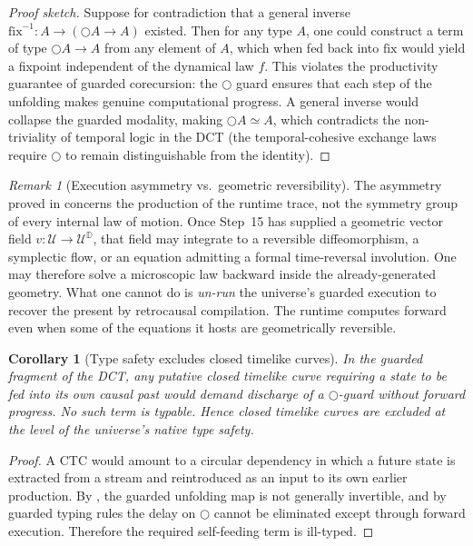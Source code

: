 \documentclass[11pt,a4paper]{article}
\theoremstyle{plain}
\newtheorem{corollary}[theorem]{Corollary}
\theoremstyle{definition}
\theoremstyle{remark}
\newtheorem{remark}[theorem]{Remark}
\newcommand{\D}{\mathbb{D}}
\newcommand{\U}{\mathcal{U}}
\newcommand{\nextmod}{\bigcirc}
\newcommand{\fix}{\mathrm{fix}}
\begin{document}
\begin{proof}[Proof sketch]
Suppose for contradiction that a general inverse $\fix^{-1} : A \to (\nextmod A \to A)$ existed.
Then for any type $A$, one could construct a term of type $\nextmod A \to A$ from any element of $A$, which when fed back into $\fix$ would yield a fixpoint independent of the dynamical law $f$.
This violates the productivity guarantee of guarded corecursion: the $\nextmod$ guard ensures that each step of the unfolding makes genuine computational progress.
A general inverse would collapse the guarded modality, making $\nextmod A \simeq A$, which contradicts the non-triviality of temporal logic in the DCT (the temporal-cohesive exchange laws require $\nextmod$ to remain distinguishable from the identity).
\end{proof}

\begin{remark}[Execution asymmetry vs.\ geometric reversibility]
\label{rem:reversibility}
The asymmetry proved in  concerns the production of the runtime trace, not the symmetry group of every internal law of motion.
Once Step~15 has supplied a geometric vector field $v : \U \to \U^{\D}$, that field may integrate to a reversible diffeomorphism, a symplectic flow, or an equation admitting a formal time-reversal involution.
One may therefore solve a microscopic law backward inside the already-generated geometry.
What one cannot do is \emph{un-run} the universe's guarded execution to recover the present by retrocausal compilation.
The runtime computes forward even when some of the equations it hosts are geometrically reversible.
\end{remark}

\begin{corollary}[Type safety excludes closed timelike curves]
\label{cor:ctc}
In the guarded fragment of the DCT, any putative closed timelike curve requiring a state to be fed into its own causal past would demand discharge of a $\nextmod$-guard without forward progress.
No such term is typable.
Hence closed timelike curves are excluded at the level of the universe's native type safety.
\end{corollary}

\begin{proof}
A CTC would amount to a circular dependency in which a future state is extracted from a stream and reintroduced as an input to its own earlier production.
By , the guarded unfolding map is not generally invertible, and by guarded typing rules the delay on $\nextmod$ cannot be eliminated except through forward execution.
Therefore the required self-feeding term is ill-typed.
\end{proof}
\end{document}
